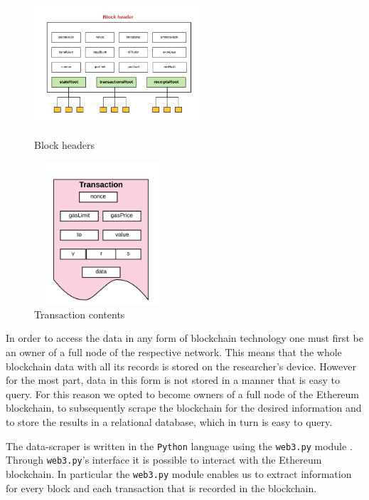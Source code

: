 \begin{figure}
\centering
\includegraphics[width=0.55\textwidth, height=200px]{figures/block-headers.png}
\caption{Block headers \cite{preethi}}
\end{figure}

\begin{figure}
\centering
\includegraphics[width=0.45\textwidth, height=200px]{figures/transaction-contents.png}
\caption{Transaction contents \cite{preethi}}
\end{figure}

In order to access the data in any form of blockchain technology one must first be an owner of a full node of the respective network. 
This means that the whole blockchain data with all its records is stored on the researcher's device. 
However for the most part, data in this form is not stored in a manner that is easy to query. 
For this reason we opted to become owners of a full node of the Ethereum blockchain, to subsequently scrape the blockchain for the desired information and to store the results in a relational database, which in turn is easy to query.

The data-scraper is written in the \texttt{Python} language using the \texttt{web3.py} module \cite{Python, web3}.
Through \texttt{web3.py}'s interface it is possible to interact with the Ethereum blockchain. 
In particular the \texttt{web3.py} module enables us to extract information for every block and each transaction that is recorded in the blockchain.

